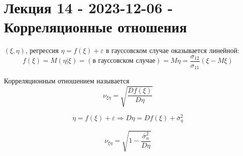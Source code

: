 \section{Лекция 14 - 2023-12-06 - Корреляционные отношения}

$(\xi, \eta)$, регрессия $\eta = f(\xi) + \varepsilon$
в гауссовском случае оказывается линейной:
\[
  f(\xi) = M(\eta | \xi) = (\text{в гауссовском случае}) = M\eta = \frac{\sigma_{12}}{\sigma_{11}} (\xi - M\xi)
\]

\begin{definition}
  Корреляционным отношением называется 
  \[
    \nu_{\xi \eta} = \sqrt{\frac{Df(\xi)}{D\eta}}
  \]

  \[
    \eta = f(\xi) + \varepsilon \Rightarrow D\eta = Df(\xi) + \bar \sigma_\eta^2
  \]

  \[
    \nu_{\xi \eta} = \sqrt{1 - \frac{\bar\sigma^2_n}{D\eta}}
  \]
\end{definition}

